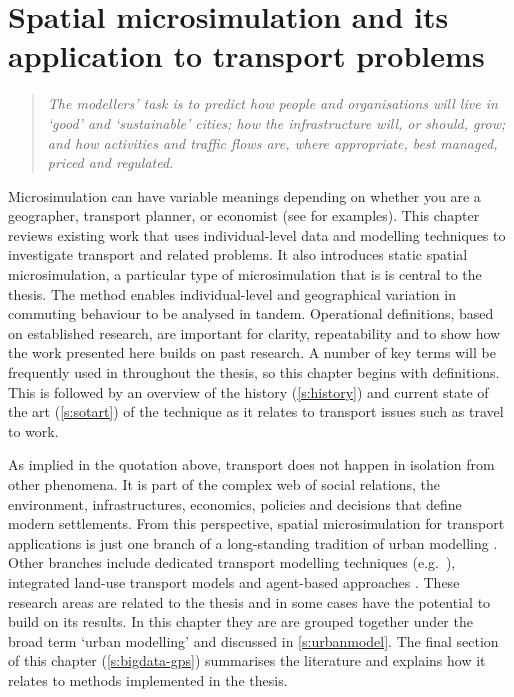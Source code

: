 
\chapter{Spatial microsimulation and its application to transport problems}
\label{Chapter3}
\fancyhead[RE,LO]{\thepage}

\begin{quote}
\textit{The modellers' task is to predict how people and organisations will live
in
`good' and `sustainable' cities; how the infrastructure will, or should, grow;
and how activities and traffic flows are, where appropriate, best managed,
priced and regulated.}
\end{quote}

Microsimulation can have variable meanings depending on whether you are a
geographer, transport planner, or economist
(see \citealp{Ballas2005b, Liu2006, Bourguignon2006} for examples).
This chapter reviews existing work that uses individual-level data and modelling
techniques to investigate transport and related problems.
It also introduces static spatial microsimulation, a particular type of
microsimulation that is is central to the thesis. The method enables
individual-level and geographical variation in commuting behaviour
to be analysed in tandem. Operational definitions, based on
established research, are important for clarity, repeatability and to
show how the work presented here builds on past research. A number of key terms will be
frequently used in throughout the thesis, so this chapter begins with
definitions.
This is followed by an overview of the history (\cref{s:history}) and current
state of the art (\cref{s:sotart}) of the technique as it relates to transport
issues such as travel to work.

As implied in the quotation above, transport does not happen in isolation from
other phenomena. It is part of the complex web of social relations, the environment,
infrastructures, economics, policies and decisions
that define modern settlements. From this
perspective, spatial microsimulation for transport applications is just one
branch of a long-standing tradition of urban modelling
\citep{Wilson1970, batty1976urban, batty2007cities}.
Other branches include dedicated transport modelling techniques
(e.g.~\citealp{SATURN2012}), integrated land-use transport  models
\citep{Wegener2009} and agent-based approaches \citep{Gilbert2008-abm}.
These research areas are related to the thesis and in some cases have
the potential to build on its results. In this chapter they are
are grouped together under the broad term `urban modelling' and
discussed in \cref{s:urbanmodel}. The final section of
this chapter (\cref{s:bigdata-gps}) summarises the literature and
explains how it relates to methods implemented in the thesis.

